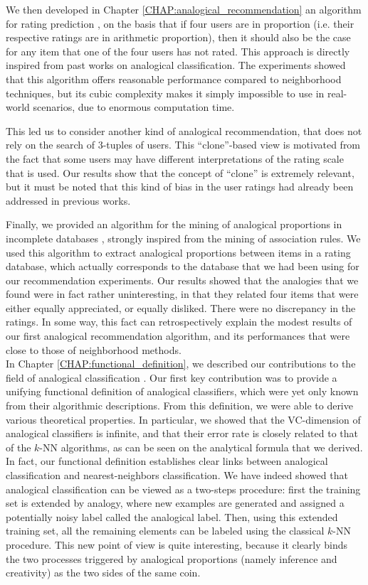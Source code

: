 We then developed in Chapter \ref{CHAP:analogical_recommendation} an algorithm
for rating prediction \cite{HugPraRicISMIS15}, on the basis that if four users
are in proportion (i.e. their respective ratings are in arithmetic proportion),
then it should also be the case for any item that one of the four users has not
rated. This approach is directly inspired from past works on analogical
classification. The experiments showed that this algorithm offers reasonable
performance compared to neighborhood techniques, but its cubic complexity makes
it simply impossible to use in real-world scenarios, due to enormous
computation time.

This led us to consider another kind of analogical recommendation, that does
not rely on the search of $3$-tuples of users. This ``clone''-based view
\cite{HugPraRicSerFuzzIEEE16} is motivated from the fact that some users may
have different interpretations of the rating scale that is used. Our results
show that the concept of ``clone'' is extremely relevant, but it must be noted
that this kind of bias in the user ratings had already been addressed in
previous works.

Finally, we provided an algorithm for the mining of analogical proportions in
incomplete databases \cite{HugPraRicSerLFA16}, strongly inspired from the
mining of association rules. We used this algorithm to extract analogical
proportions between items in a rating database, which actually corresponds to
the database that we had been using for our recommendation experiments. Our
results showed that the analogies that we found were in fact rather
uninteresting, in that they related four items that were either equally
appreciated, or equally disliked. There were no discrepancy in the ratings. In
some way, this fact can retrospectively explain the modest results of our first
analogical recommendation algorithm, and its performances that were close to
those of neighborhood methods.\\

In Chapter \ref{CHAP:functional_definition}, we described our contributions to
the field of analogical classification \cite{HugPraRicSerECAI16}. Our first key
contribution was to provide a unifying functional definition of analogical
classifiers, which were yet only known from their algorithmic descriptions.
From this definition, we were able to derive various theoretical properties. In
particular, we showed that the VC-dimension of analogical classifiers is
infinite, and that their error rate is closely related to that of the $k$-NN
algorithms, as can be seen on the analytical formula that we derived. In fact,
our functional definition establishes clear links between analogical
classification and nearest-neighbors classification. We have indeed showed that
analogical classification can be viewed as a two-steps procedure: first the
training set is extended by analogy, where new examples are generated and
assigned a potentially noisy label called the analogical label. Then, using
this extended training set, all the remaining elements can be labeled using the
classical $k$-NN procedure. This new point of view is quite interesting,
because it clearly binds the two processes triggered by analogical proportions
(namely inference and creativity) as the two sides of the same coin.

